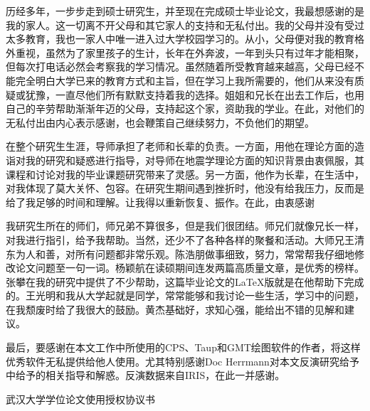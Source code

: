 

\acknowledgement

历经多年，一步步走到硕士研究生，并至现在完成硕士毕业论文，我最想感谢的是我的家人。这一切离不开父母和其它家人的支持和无私付出。我的父母并没有受过太多教育，我也一家人中唯一进入过大学校园学习的。从小，父母便对我的教育格外重视，虽然为了家里孩子的生计，长年在外奔波，一年到头只有过年才能相聚，但每次打电话必然会考察我的学习情况。虽然随着所受教育越来越高，父母已经不能完全明白大学已来的教育方式和主旨，但在学习上我所需要的，他们从来没有质疑或犹豫，一直尽他们所有默默支持着我的选择。姐姐和兄长在出去工作后，也用自己的辛劳帮助渐渐年迈的父母，支持起这个家，资助我的学业。在此，对他们的无私付出由内心表示感谢，也会鞭策自己继续努力，不负他们的期望。

在整个研究生生涯，导师承担了老师和长辈的负责。一方面，用他在理论方面的造诣对我的研究和疑惑进行指导，对导师在地震学理论方面的知识背景由衷佩服，其课程和讨论对我的毕业课题研究带来了灵感。另一方面，他作为长辈，在生活中，对我体现了莫大关怀、包容。在研究生期间遇到挫折时，他没有给我压力，反而是给了我足够的时间和理解。让我得以重新恢复、振作。在此，由衷感谢

我研究生所在的师们，师兄弟不算很多，但是我们很团结。师兄们就像兄长一样，对我进行指引，给予我帮助。当然，还少不了各种各样的聚餐和活动。大师兄王清东为人和善，对所有问题都非常乐观。陈浩朋做事细致，努力，常常帮我仔细地修改论文问题至一句一词。杨颖航在读硕期间连发两篇高质量文章，是优秀的榜样。张攀在我的研究中提供了不少帮助，这篇毕业论文的\LaTeX{}版就是在他帮助下完成的。王光明和我从大学起就是同学，常常能够和我讨论一些生活，学习中的问题，在我颓废时给了我很大的鼓励。黄杰基础好，求知心强，能给出不错的见解和建议。

最后，要感谢在本文工作中所使用的CPS、Taup和GMT绘图软件的作者，将这样优秀软件无私提供给他人使用。尤其特别感谢Doc Herrmann对本文反演研究给予中给予的相关指导和解惑。反演数据来自IRIS，在此一并感谢。




\cleardoublepage
\newpage\vspace*{20pt}
\begin{center}{\heiti 武汉大学学位论文使用授权协议书}\end{center}
\par\vspace*{30pt}

